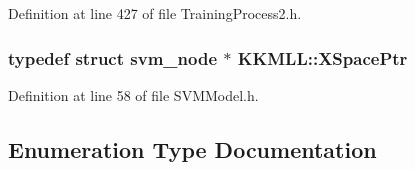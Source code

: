 Definition at line 427 of file Training\+Process2.\+h.

\subsubsection[{\texorpdfstring{X\+Space\+Ptr}{XSpacePtr}}]{\setlength{\rightskip}{0pt plus 5cm}typedef struct {\bf svm\+\_\+node} $\ast$ {\bf K\+K\+M\+L\+L\+::\+X\+Space\+Ptr}}\hypertarget{namespace_k_k_m_l_l_abbdd347e3f7ba84af6a5452ef7a0cfef}{}\label{namespace_k_k_m_l_l_abbdd347e3f7ba84af6a5452ef7a0cfef}


Definition at line 58 of file S\+V\+M\+Model.\+h.



\subsection{Enumeration Type Documentation}
